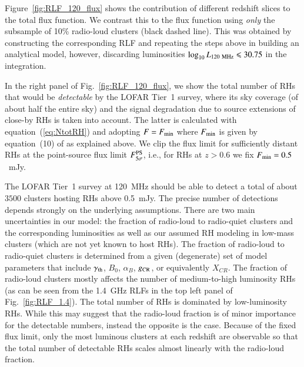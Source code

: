 \documentclass[useAMS,usenatbib]{mn2e}
\begin{document}
Figure~\ref{fig:RLF_120_flux} shows the contribution of different redshift
slices to the total flux function. We contrast this to the flux function using
\emph{only} the subsample of 10\% radio-loud clusters (black dashed line). This
was obtained by constructing the corresponding RLF and repeating the steps above
in building an analytical model, however, discarding luminosities $\log_{10}
L_{120~{\mathrm{MHz}}} \leqslant 30.75$ in the integration.

In the right panel of Fig.~\ref{fig:RLF_120_flux}, we show the total number of
RHs that would be \emph{detectable} by the LOFAR Tier~1 survey, where its sky
coverage (of about half the entire sky) and the signal degradation due to source
extensions of close-by RHs is taken into account. The latter is calculated with
equation~(\ref{eq:NtotRH}) and adopting $F = F_{{\mathrm{min}}}$ where
$F_{{\mathrm{min}}}$ is given by equation~(10) of \cite{2010A&A...509A..68C} as
explained above. We clip the flux limit for sufficiently distant RHs at the
point-source flux limit $F_{5\sigma}^{{\mathrm{PS}}}$, i.e., for RHs at $z > 0.6$ we
fix $F_{{\mathrm{min}}} = 0.5$~mJy.

The LOFAR Tier~1 survey at 120~MHz should be able to detect a total of about
$3500$ clusters hosting RHs above 0.5~mJy. The precise number of detections
depends strongly on the underlying assumptions. There are two main uncertainties
in our model: the fraction of radio-loud to radio-quiet clusters and the
corresponding luminosities as well as our assumed RH modeling in low-mass
clusters (which are not yet known to host RHs). The fraction of radio-loud to
radio-quiet clusters is determined from a given (degenerate) set of model
parameters that include $\gamma_{{\mathrm{th}}}$, $B_{0}$, $\alpha_{B}$,
$g_{{\mathrm{CR}}}$, or equivalently $X_{CR}$. The fraction of radio-loud clusters
mostly affects the number of medium-to-high luminosity RHs (as can be seen from
the 1.4~GHz RLFs in the top left panel of Fig.~\ref{fig:RLF_1.4}). The total
number of RHs is dominated by low-luminosity RHs. While this may suggest that
the radio-loud fraction is of minor importance for the detectable numbers,
instead the opposite is the case. Because of the fixed flux limit, only the most
luminous clusters at each redshift are observable so that the total number of
detectable RHs scales almost linearly with the radio-loud fraction.

\end{document}

